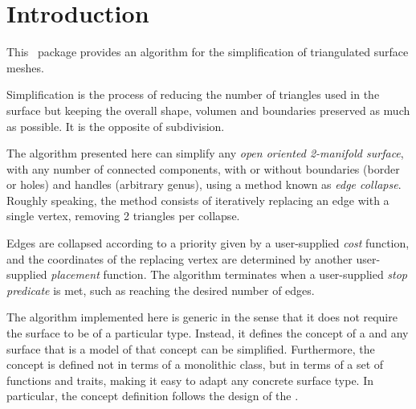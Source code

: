 
\section{Introduction}

This \cgal\ package provides an algorithm for the simplification of triangulated surface meshes.

Simplification is the process of reducing the number of triangles used in the surface but keeping the overall shape, volumen and boundaries preserved as much as possible. It is the opposite of subdivision.


The algorithm presented here can simplify any {\em open oriented 2-manifold surface}, with any number of connected components, with or without boundaries (border or holes) and handles (arbitrary genus), using a method known as {\em edge collapse}.\\
Roughly speaking, the method consists of iteratively replacing an edge with a single vertex, removing 2 triangles per collapse.


Edges are collapsed according to a priority given by a user-supplied {\em cost} function, and the coordinates of the replacing vertex are determined by another user-supplied {\em placement} function. The algorithm terminates when a user-supplied {\em stop predicate} is met, such as reaching the desired number of edges.

The algorithm implemented here is generic in the sense that it does not require the surface to be of a particular type. Instead, it defines the concept of a  and any surface that is a model of that concept can be simplified. Furthermore, the concept is defined not in terms of a monolithic class, but in terms of a set of functions and traits, making it easy to adapt any concrete surface type. In particular, the concept definition follows the design of the 
 .

